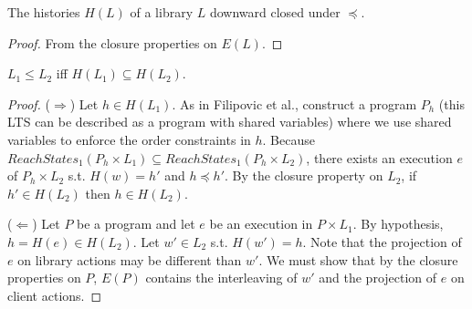 \begin{lemma}
  
  The histories $H(L)$ of a library $L$ downward closed under $\preceq$.

\end{lemma}

\begin{proof}

  From the closure properties on $E(L)$.

\end{proof}

\begin{theorem}

  $L_1 \leq L_2$ iff $H(L_1) \subseteq H(L_2)$.

\end{theorem}

\begin{proof}

  ($\Rightarrow$) Let $h\in H(L_1)$. As in Filipovic et al., construct a
  program $P_h$ (this LTS can be described as a program with shared variables)
  where we use shared variables to enforce the order constraints in $h$.
  Because $ReachStates_1(P_h\times L_1) \subseteq ReachStates_1(P_h\times
  L_2)$, there exists an execution $e$ of $P_h\times L_2$ s.t. $H(w)=h'$ and
  $h\preceq h'$. By the closure property on $L_2$, if $h'\in H(L_2)$ then $h\in
  H(L_2)$.

  ($\Leftarrow$) Let $P$ be a program and let $e$ be an execution in $P\times
  L_1$. By hypothesis, $h=H(e)\in H(L_2)$. Let $w'\in L_2$ s.t. $H(w')=h$. Note
  that the projection of $e$ on library actions may be different than $w'$. We
  must show that by the closure properties on $P$, $E(P)$ contains the
  interleaving of $w'$ and the projection of $e$ on client actions.

\end{proof}

